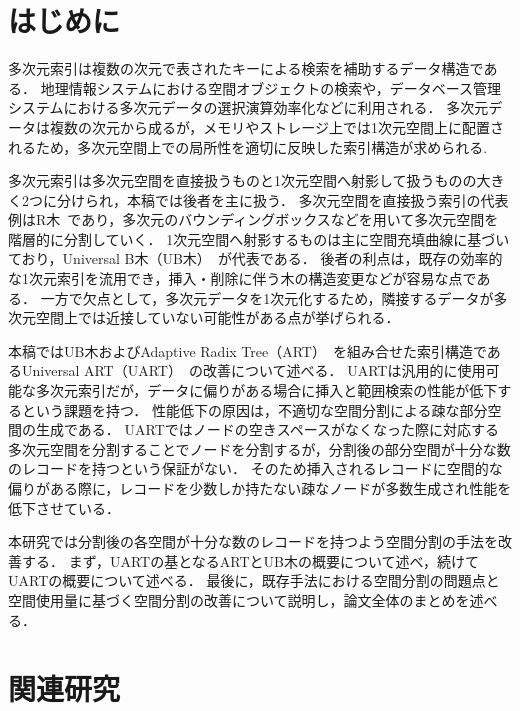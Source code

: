 
\chapter{はじめに}

多次元索引は複数の次元で表されたキーによる検索を補助するデータ構造である．
地理情報システムにおける空間オブジェクトの検索や，データベース管理システムにおける多次元データの選択演算効率化などに利用される．
多次元データは複数の次元から成るが，メモリやストレージ上では1次元空間上に配置されるため，多次元空間上での局所性を適切に反映した索引構造が求められる.

多次元索引は多次元空間を直接扱うものと1次元空間へ射影して扱うものの大きく2つに分けられ，本稿では後者を主に扱う．
多次元空間を直接扱う索引の代表例はR木~\cite{sigmod:Beckmann1990}であり，多次元のバウンディングボックスなどを用いて多次元空間を階層的に分割していく．
1次元空間へ射影するものは主に空間充填曲線に基づいており，Universal B木（UB木）~\cite{wwca:Bayer1997}が代表である．
後者の利点は，既存の効率的な1次元索引を流用でき，挿入・削除に伴う木の構造変更などが容易な点である．
一方で欠点として，多次元データを1次元化するため，隣接するデータが多次元空間上では近接していない可能性がある点が挙げられる．

本稿ではUB木およびAdaptive Radix Tree（ART）~\cite{icde:Leis2013}を組み合せた索引構造であるUniversal ART（UART）~\cite{deim:Suzuki2023}の改善について述べる．
UARTは汎用的に使用可能な多次元索引だが，データに偏りがある場合に挿入と範囲検索の性能が低下するという課題を持つ．
性能低下の原因は，不適切な空間分割による疎な部分空間の生成である．
UARTではノードの空きスペースがなくなった際に対応する多次元空間を分割することでノードを分割するが，分割後の部分空間が十分な数のレコードを持つという保証がない．
そのため挿入されるレコードに空間的な偏りがある際に，レコードを少数しか持たない疎なノードが多数生成され性能を低下させている．

本研究では分割後の各空間が十分な数のレコードを持つよう空間分割の手法を改善する．
まず，UARTの基となるARTとUB木の概要について述べ，続けてUARTの概要について述べる．
最後に，既存手法における空間分割の問題点と空間使用量に基づく空間分割の改善について説明し，論文全体のまとめを述べる．




\chapter{関連研究}


